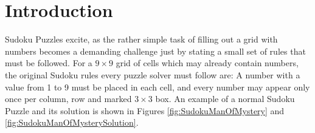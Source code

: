 \chapter{Introduction}

Sudoku Puzzles excite, as the rather simple task of filling out a grid with numbers becomes a demanding challenge just by stating a small set of rules that must be followed. For a $9 \times 9$ grid of cells which may already contain numbers, the original Sudoku rules every puzzle solver must follow are: A number with a value from 1 to 9 must be placed in each cell, and every number may appear only once per column, row and marked $3\times3$ box. An example of a normal Sudoku Puzzle and its solution is shown in Figures \ref{fig:SudokuManOfMystery} and \ref{fig:SudokuManOfMysterySolution}.


